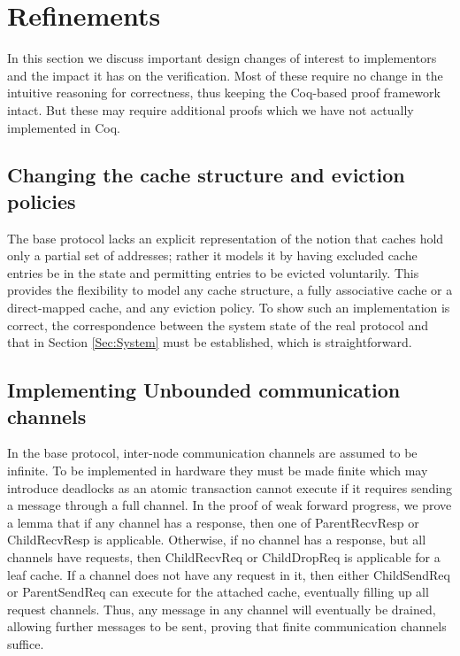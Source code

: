 \section{Refinements}
\label{Sec:Refinements}

In this section we discuss important design changes of interest to implementors
and the impact it has on the verification. Most of these require no change in
the intuitive reasoning for correctness, thus keeping the Coq-based proof
framework intact. But these may require additional proofs which we have not
actually implemented in Coq.


\subsection{Changing the cache structure and eviction policies}

The base protocol lacks an explicit representation of the notion that
caches hold only a partial set of addresses; rather it models it by
having excluded cache entries be in the \In{} state and permitting
entries to be evicted voluntarily. This provides the flexibility to
model any cache structure, \eg{} a fully associative cache or a
direct-mapped cache, and any eviction policy. To show such an
implementation is correct, the correspondence
between the system state of the real protocol and that in Section
\ref{Sec:System} must be established, which is straightforward.


\subsection{Implementing Unbounded communication channels}

In the base protocol, inter-node communication channels are assumed to
be infinite. To be implemented in hardware they must be made finite
which may introduce deadlocks as an atomic transaction cannot execute
if it requires sending a message through a full channel. In the proof
of weak forward progress, we prove a lemma that if any channel has a
response, then one of ParentRecvResp or ChildRecvResp is
applicable. Otherwise, if no channel has a response, but all channels
have requests, then ChildRecvReq or ChildDropReq is applicable for a
leaf cache. If a channel does not have any request in it, then either
ChildSendReq or ParentSendReq can execute for the attached cache,
eventually filling up all request channels.  Thus, any message in any
channel will eventually be drained, allowing further messages to be
sent, proving that finite communication channels suffice.

